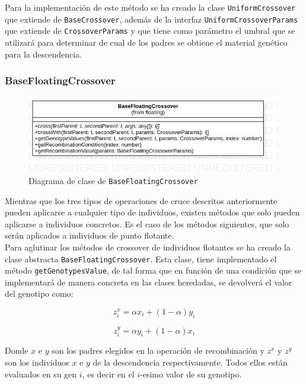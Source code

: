 Para la implementación de este método se ha creado la clase \texttt{UniformCrossover} que extiende de \texttt{BaseCrossover}, además de la interfaz \texttt{UniformCrossoverParams} que extiende de \texttt{CrossoverParams} y que tiene como parámetro el umbral que se utilizará para determinar de cual de los padres se obtiene el material genético para la descendencia.

\subsubsection{BaseFloatingCrossover}

\begin{figure}[ht]
    \centering
    \includegraphics[scale=0.5]{mem/images/cap-4/4.2.6(Crossover)/BaseFloating.png}
    \caption{Diagrama de clase de \texttt{BaseFloatingCrossover}}
    \label{fig:my_label}
\end{figure}

Mientras que los tres tipos de operaciones de cruce descritos anteriormente pueden aplicarse a cualquier tipo de individuos, existen métodos que solo pueden aplicarse a individuos concretos. Es el caso de los métodos siguientes, que solo serán aplicados a individuos de punto flotante. \\

Para aglutinar los métodos de crossover de individuos flotantes se ha creado la clase abstracta \texttt{BaseFloatingCrossover}. Esta clase, tiene implementado el método \texttt{getGenotypesValue}, de tal forma que en función de una condición que se implementará de manera concreta en las clases heredadas, se devolverá el valor del genotipo como: 

\begin{equation}
    z^x_i = \alpha x_i + (1 - \alpha)y_i
\end{equation}

\begin{equation}
    z^y_i = \alpha y_i + (1 - \alpha)x_i
\end{equation}

Donde $x$ e $y$ son los padres elegidos en la operación de recombinación y $z^x$ y $z^y$ son los individuos $x$ e $y$ de la descendencia respectivamente. Todos ellos están evaluados en su gen $i$, es decir en el $i$-esimo valor de su genotipo. \\

